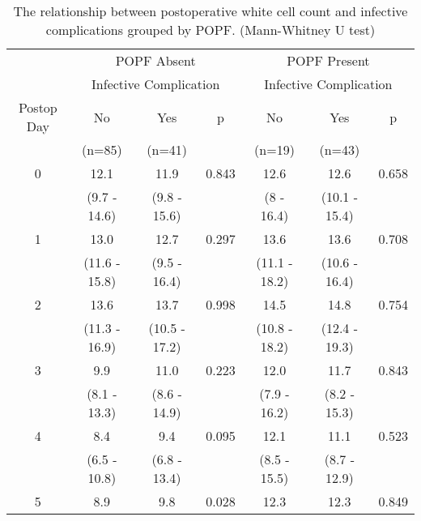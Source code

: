 \begin{table}[h]
	\centering
	\caption{The relationship between postoperative white cell count and infective complications grouped by POPF. (Mann-Whitney U test)}
	\label{table:crp_comp_WCC_vs_infections_popf_y1n0}
	\begin{tabular}{| c | c c c | c c c |}
		\hline
		           &       \multicolumn{3}{c|}{POPF Absent}       &      \multicolumn{3}{c|}{POPF Present}       \\
		           & \multicolumn{3}{c|}{Infective Complication} & \multicolumn{3}{c|}{Infective Complication} \\
		Postop Day & No            & Yes           & p            & No            & Yes           & p            \\
		           & (n=85)        & (n=41)        &              & (n=19)        & (n=43)        &  \\ \hline
		0          & 12.1          & 11.9          & 0.843        & 12.6          & 12.6          & 0.658        \\
		           & (9.7 - 14.6)  & (9.8 - 15.6)  &              & (8 - 16.4)    & (10.1 - 15.4) &  \\
		1          & 13.0          & 12.7          & 0.297        & 13.6          & 13.6          & 0.708        \\
		           & (11.6 - 15.8) & (9.5 - 16.4)  &              & (11.1 - 18.2) & (10.6 - 16.4) &  \\
		2          & 13.6          & 13.7          & 0.998        & 14.5          & 14.8          & 0.754        \\
		           & (11.3 - 16.9) & (10.5 - 17.2) &              & (10.8 - 18.2) & (12.4 - 19.3) &  \\
		3          & 9.9           & 11.0          & 0.223        & 12.0          & 11.7          & 0.843        \\
		           & (8.1 - 13.3)  & (8.6 - 14.9)  &              & (7.9 - 16.2)  & (8.2 - 15.3)  &  \\
		4          & 8.4           & 9.4           & 0.095        & 12.1          & 11.1          & 0.523        \\
		           & (6.5 - 10.8)  & (6.8 - 13.4)  &              & (8.5 - 15.5)  & (8.7 - 12.9)  &  \\
		5          & 8.9           & 9.8           & 0.028        & 12.3          & 12.3          & 0.849        \\

\end{tabular}
\end{table}
